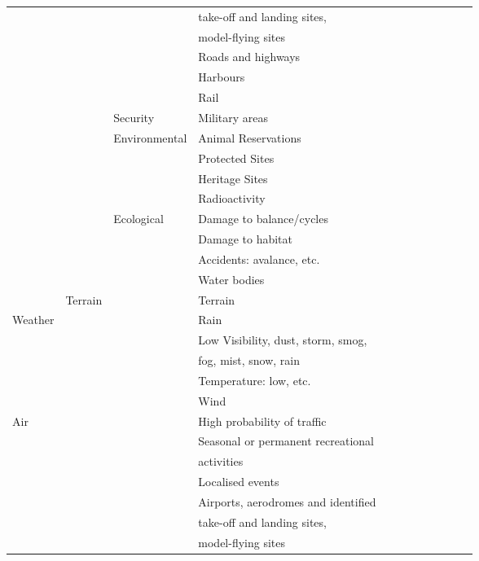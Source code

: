\documentclass{report}
\begin{document}
\begin{centering}
\begin{longtable}{|l|l|l|l|c|c|c|c|c|c|c|c|}
  & & & take-off and landing sites, & & & & & & & & \\
  & & & model-flying sites & & & & & & & & \\\cline{4-4}
  & & & Roads and highways & & & & & & & & \\\cline{4-4}
  & & & Harbours & & & & & & & & \\\cline{4-4}
  & & & Rail & & & & & & & & \\\cline{3-4}
  & & Security & Military areas & & & & & & & & \\\cline{3-4}
  & & Environmental & Animal Reservations & & & & & & & & \\\cline{4-4}
  & & & Protected Sites & & & & & & & & \\\cline{4-4}
  & & & Heritage Sites & & & & & & & & \\\cline{4-4}
  & & & Radioactivity & & & & & & & & \\\cline{3-4}
  & & Ecological & Damage to balance/cycles & & & & & & & & \\\cline{4-4}
  & & & Damage to habitat & & & & & & & & \\\cline{4-4}
  & & & Accidents: avalance, etc. & & & & & & & & \\\cline{4-4}
  & & & Water bodies & & & & & & & & \\\cline{2-4}
  & Terrain & & Terrain & & & & & & & & \\\cline{1-4}
  \multirow{5}{3em}{Weather} & & & Rain & & & & & & & & \\\cline{4-4}
  & & & Low Visibility, dust, storm, smog, & & & & & & & & \\\cline{4-4}
  & & & fog, mist, snow, rain & & & & & & & & \\\cline{4-4}
  & & & Temperature: low, etc. & & & & & & & & \\\cline{4-4}
  & & & Wind & & & & & & & & \\\cline{1-4}
  \multirow{7}{3em}{Air} & & & High probability of traffic & & & & & & & & \\\cline{4-4}
  & & & Seasonal or permanent recreational & & & & & & & & \\
  & & & activities & & & & & & & & \\\cline{4-4}
  & & & Localised events & & & & & & & & \\\cline{4-4}
  & & & Airports, aerodromes and identified &  & & & & & & & \\
  & & & take-off and landing sites,  & & & & & & & & \\
  & & & model-flying sites & & & & & & & & \\\cline{4-4}

\end{longtable}
\end{centering}
\end{document}
